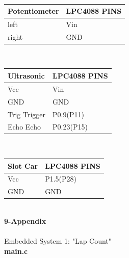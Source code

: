 \documentclass{article}
\begin{document}
\\[1in]
\begin{tabular}{| C{5cm} | C{5cm} |}
\hline
Potentiometer&LPC4088 PINS\\
\hline
left & Vin\\
\hline
right & GND\\
\hline
\end{tabular}
\\[1in]
\begin{tabular}{| C{5cm} | C{5cm} |}
\hline
Ultrasonic&LPC4088 PINS\\
\hline
Vcc & Vin\\
\hline
GND & GND\\
\hline
Trig Trigger & P0.9(P11)\\
\hline
Echo Echo & P0.23(P15)\\
\hline
\end{tabular}
\\[1in]
\begin{tabular}{| C{5cm} | C{5cm} |}
\hline
Slot Car&LPC4088 PINS\\
\hline
Vcc & P1.5(P28)\\
\hline
GND & GND\\
\hline
\end{tabular}
\\
\clearpage
{\huge\textbf {9-Appendix}}
\\
\\[0.2in]
{\huge {Embedded System 1: "Lap Count"}}
\\
\newline
\textbf{main.c}
\end{document}
